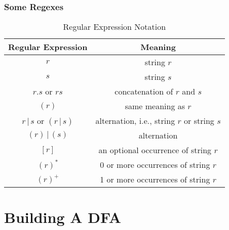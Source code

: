 \documentclass{beamer}
\begin{document}
\begin{frame}
    \frametitle{Some Regexes}

     \begin{table}[h]
        \centering
        \begin{tabular}{c|c} 
            \hline
            Regular Expression & Meaning \\ 
            \hline
            \( r \) & string \( r \) \\
            \( s \) & string \( s \) \\
            \( r.s \) or \( rs \) & concatenation of \( r \) and \( s \) \\
            \( (r) \) & same meaning as \( r \) \\
            \( r \,\vert\, s \) or \( (r \,\vert\, s) \) & alternation, i.e., string \( r \) or string \( s \) \\
            \( (r) \,\vert\, (s) \) & alternation \\
            \( [r] \) & an optional occurrence of string \( r \) \\
            \( (r)^{*} \) & 0  or more occurrences of string \( r \) \\
            \( (r)^{+} \) &  1  or more occurrences of string \( r \) \\
            \hline
        \end{tabular}
        \caption{Regular Expression Notation}
    \end{table}
\end{frame}

\section{Building A DFA}
\end{document}
